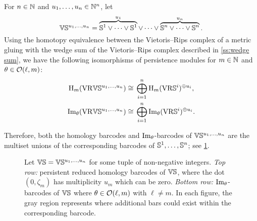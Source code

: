 \subsubsection{}

For $n \in \mathbb{N}$ and $u_1, \dots, u_n \in \mathbb{N}^n$, let
\[
\mathbb{V}\mathbb{S}^{u_1,\dots,u_n} =
\overbrace{\mathbb{S}^1\vee\dots\vee\mathbb{S}^1}^{u_1} \vee\dots\vee \overbrace{\mathbb{S}^n\vee\dots\vee\mathbb{S}^n}^{u_n}.
\]
Using the homotopy equivalence between the Vietoris--Rips complex of a metric gluing with the wedge sum of the Vietoris--Rips complex described in \cref{ss:wedge sum}, we have the following isomorphisms of persistence modules for \(m \in \mathbb{N}\) and \(\theta \in \mathcal{O}(\ell,m)\):
\[
\begin{split}
	\mathrm{H}_m (\mathrm{VR}\mathbb{V}\mathbb{S}^{u_1,\dots,u_n}) &\cong \, \bigoplus_{i=1}^n \mathrm{H}_m (\mathrm{VR}\mathbb{S}^i)^{\oplus u_i}, \\
	\operatorname{Im}_\theta (\mathrm{VR}\mathbb{V}\mathbb{S}^{u_1,\dots,u_n}) &\cong \, \bigoplus_{i=1}^n \operatorname{Im}_\theta (\mathrm{VR}\mathbb{S}^i)^{\oplus u_i}.
\end{split}
\]

Therefore, both the homology barcodes and \(\operatorname{Im}_\theta\)-barcodes of \(\mathbb{V}\mathbb{S}^{u_1, \dots, u_n}\) are the multiset unions of the corresponding barcodes of \(\mathbb{S}^1, \dots, \mathbb{S}^n\); see \cref{fig:barcodes_vs}.



\begin{figure}
	\centering
	
	\caption{Let $\mathbb{V}\mathbb{S} = \mathbb{V}\mathbb{S}^{u_1,\dots,u_n}$ for some tuple of non-negative integers.
		\emph{Top row:} persistent reduced homology barcodes of $\mathbb{V}\mathbb{S}$, where the dot $(0,\zeta_m)$ has multiplicity $u_m$ which can be zero.
		\emph{Bottom row:} $\operatorname{Im}_\theta$-barcodes of $\mathbb{V}\mathbb{S}$ where $\theta \in \mathcal{O}(\ell,m)$ with \(\ell \neq m\).
        In each figure, the gray region represents where additional bars could exist within the corresponding barcode.}
	\label{fig:barcodes_vs}
\end{figure}
